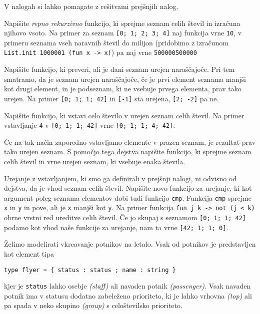 \documentclass[arhiv]{../izpit}
\begin{document}


V nalogah si lahko pomagate z rešitvami prejšnjih nalog.

\naloga

Napišite \emph{repno rekurzivno} funkcijo, ki sprejme seznam celih števil in
izračuna njihovo vsoto. Na primer za seznam \verb|[0; 1; 2; 3; 4]| naj funkcija
vrne \verb|10|, v primeru seznama vseh naravnih števil do milijon (pridobimo
z izračunom \verb|List.init 1000001 (fun x -> x)|) pa naj vrne \verb|500000500000|

\naloga

Napišite funkcijo, ki preveri, ali je dani seznam urejen naraščajoče. Pri tem
smatramo, da je seznam urejen naraščajoče, če je prvi element seznama manjši kot
drugi element, in je podseznam, ki ne vsebuje prvega elementa, prav tako urejen.
Na primer \verb|[0; 1; 1; 42]| in \verb|[-1]| sta urejena, \verb|[2; -2]| pa ne.

\naloga

Napišite funkcijo, ki vstavi celo število v urejen seznam celih števil.
Na primer vstavljanje \verb|4| v \verb|[0; 1; 1; 42]| vrne  \verb|[0; 1; 1; 4; 42]|.

Če na tak način zaporedno vstavljamo elemente v prazen seznam, je rezultat prav
tako urejen seznam. S pomočjo tega dejstva napišite funkcijo, ki sprejme seznam 
celih števil in vrne urejen seznam, ki vsebuje enaka števila.

\naloga

Urejanje z vstavljanjem, ki smo ga definirali v prejšnji nalogi, ni odvisno od 
dejstva, da je vhod seznam celih števil. Napišite novo funkcijo za urejanje, ki
kot argument poleg seznama elementov dobi tudi funkcijo \verb|cmp|. Funkcija
\verb|cmp| sprejme \verb|x| in \verb|y| in pove, ali je \verb|x| manjši kot \verb|y|.
Na primer funkcija \verb|fun j k -> not (j < k)| obrne vrstni red 
ureditve celih števil. Če jo skupaj s seznamom \verb|[0; 1; 1; 42]| podamo kot
vhod naše funkcije za urejanje, nam ta vrne \verb|[42; 1; 1; 0]|.

\naloga

Želimo modelirati vkrcavanje potnikov na letalo. Vsak od potnikov je predstavljen
kot element tipa
%
\begin{verbatim}
type flyer = { status : status ; name : string }
\end{verbatim}
%
kjer je \verb|status| lahko osebje \emph{(staff)} ali navaden potnik \emph{(passenger)}. 
Vsak navaden potnik ima v statusu dodatno zabeleženo prioriteto, ki je lahko vrhovna \emph{(top)} ali pa 
spada v neko skupino \emph{(group)} s celoštevilsko prioriteto.
\end{document}
